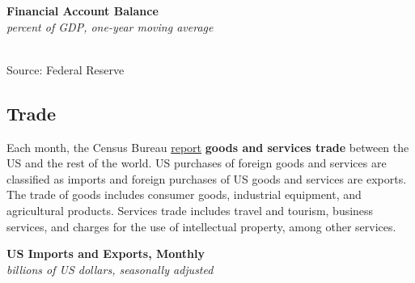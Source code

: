 \documentclass{report}
\makeatletter
\newcommand{\tbllink}[1]{\href{https://raw.githubusercontent.com/bdecon/US-chartbook/master/chartbook/data/#1}{\faTable}}
\newcommand*\short[1]{\expandafter\@gobbletwo\number\numexpr#1\relax}
\newcommand{\sbar}[4]{
		\addplot[ybar stacked, bar width=2.4pt, draw opacity=0, fill=#1] 
			table [x=#2, y=#3, col sep=comma]{#4};}
\newcommand{\absnode}[3]{\node[below right, align=left] at (axis cs: #1,#2) {#3};}
\newcommand{\dateaxisticks}{
		date coordinates in=x, axis line style={draw=none},
		xmax={2023-02-15},
		max space between ticks=40,	    
		xtick={{1990-01-01}, {1992-01-01}, {1994-01-01}, 
			{1996-01-01}, {1998-01-01}, {2000-01-01}, 
			{2002-01-01}, {2004-01-01}, {2006-01-01},
			{2008-01-01}, {2010-01-01}, {2012-01-01}, {2014-01-01},
		    {2016-01-01}, {2018-01-01}, {2020-01-01}, {2022-01-01}, 
		    {2024-01-01}, {2026-01-01}},
		minor xtick={{1989-01-01}, {1991-01-01}, {1993-01-01},
			{1995-01-01}, {1997-01-01}, {1999-01-01}, 
			{2001-01-01}, {2003-01-01}, {2005-01-01}, {2007-01-01},
		    {2009-01-01}, {2011-01-01}, {2013-01-01}, {2015-01-01},
		    {2017-01-01}, {2019-01-01}, {2021-01-01}, {2023-01-01}, 
		    {2025-01-01}, {2027-01-01}},
		enlarge y limits={0.06}, enlarge x limits={0.01},
		}
\newcommand{\ltdateaxisticks}{
		date coordinates in=x, axis line style={draw=none},
		xmax={2023-02-15},
		max space between ticks=40,	    
		xtick={{2013-01-01}, {2014-01-01}, {2015-01-01}, {2016-01-01}, {2017-01-01}, {2018-01-01}, 
		    {2019-01-01}, {2020-01-01}, {2021-01-01}, {2022-01-01}, {2023-01-01}},
		enlarge y limits={0.06}, enlarge x limits={0.01},
		}
\newcommand{\bbar}[2]{extra #1 ticks = {{#2}}, extra #1 tick labels = ,
		extra #1 tick style = {grid=major, grid style={thick, black!25}},}
\newcommand{\stdline}[4]{\addplot[very thick, no markers, color=#1] 
		table [x=#2, y=#3, col sep=comma] {#4};	}
\newcommand{\rbars}{
		\fill[color=black!10] (axis cs:{1990-07-01},\pgfkeysvalueof{/pgfplots/ymin}) rectangle 
			(axis cs:{1991-03-01}, \pgfkeysvalueof{/pgfplots/ymax});
		\fill[color=black!10] (axis cs:{2007-12-01},\pgfkeysvalueof{/pgfplots/ymin}) rectangle 
			(axis cs:{2009-07-01}, \pgfkeysvalueof{/pgfplots/ymax});
		\fill[color=black!10] (axis cs:{2001-03-01},\pgfkeysvalueof{/pgfplots/ymin}) rectangle 
			(axis cs:{2001-11-01}, \pgfkeysvalueof{/pgfplots/ymax});
		\fill[color=black!10] (axis cs:{2020-02-01},\pgfkeysvalueof{/pgfplots/ymin}) rectangle 
			(axis cs:{2020-05-01}, \pgfkeysvalueof{/pgfplots/ymax});}
\newcommand{\rbar}{
		\fill[color=black!10] (axis cs:{2020-02-01},\pgfkeysvalueof{/pgfplots/ymin}) rectangle 
			(axis cs:{2020-05-01}, \pgfkeysvalueof{/pgfplots/ymax});}
\makeatother
\begin{document}
{\begin{minipage}{0.76\textwidth}
\normalsize \textbf{Financial Account Balance}\\
\footnotesize{\textit{percent of GDP, one-year moving average}}\\
\hspace*{-2mm} \\
\footnotesize{Source: Federal Reserve} \hfill \tbllink{fabz1.csv}
\end{minipage}
\newpage
\hypertarget{extt}{}
\begin{minipage}{0.76\textwidth}
\subsection*{Trade}
\small Each month, the Census Bureau \href{https://www.census.gov/foreign-trade/Press-Release/current\_press\_release/index.html}{report} \textbf{goods and services trade} between the US and the rest of the world. US purchases of foreign goods and services are classified as imports and foreign purchases of US goods and services are exports. The trade of goods includes consumer goods, industrial equipment, and agricultural products. Services trade includes travel and tourism, business services, and charges for the use of intellectual property, among other services. 
\end{minipage}
\vspace{1mm}

\begin{minipage}{0.37\textwidth}
\normalsize \textbf{US Imports and Exports, Monthly}\\
\footnotesize{\textit{billions of US dollars, seasonally adjusted}}\\
\hspace*{-2mm} 
\vspace{-2mm}


\end{minipage}}
\end{document}
